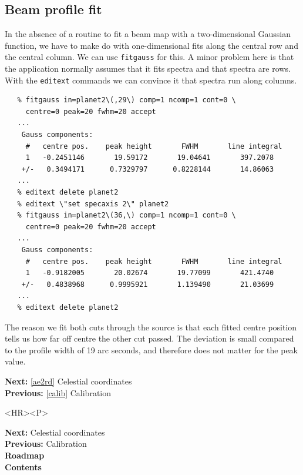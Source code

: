 \documentclass[11pt]{article}
\newenvironment{latexonly}{}{}
\newcommand{\htmlref}[2]{#1}
\newcommand{\xref}[3]{#1}
\newcommand{\xlabel}[1]{}
\begin{document}
\subsection{\label{beam}\xlabel{beam}Beam profile fit}

   In the absence of a routine to fit a beam map with a two-dimensional
   Gaussian function, we have to make do with one-dimensional fits
   along the central row and the central column. We can use
{\tt \xref{fitgauss}{sun140}{FITGAUSS}}
   for this. A minor problem here is that the application normally
   assumes that it fits spectra and that spectra are rows. With the
{\tt \xref{editext}{sun140}{EDITEXT}}
   commands we can convince it that spectra run along columns.

\begin{verbatim}
   % fitgauss in=planet2\(,29\) comp=1 ncomp=1 cont=0 \
     centre=0 peak=20 fwhm=20 accept
   ...
    Gauss components:
     #   centre pos.    peak height       FWHM       line integral
     1   -0.2451146       19.59172       19.04641       397.2078
    +/-   0.3494171      0.7329797      0.8228144       14.86063
   ...
   % editext delete planet2
   % editext \"set specaxis 2\" planet2
   % fitgauss in=planet2\(36,\) comp=1 ncomp=1 cont=0 \
     centre=0 peak=20 fwhm=20 accept
   ...
    Gauss components:
     #   centre pos.    peak height       FWHM       line integral
     1   -0.9182005       20.02674       19.77099       421.4740
    +/-   0.4838968      0.9995921       1.139490       21.03699
   ...
   % editext delete planet2
\end{verbatim}

   The reason we fit both cuts through the source is that each fitted
   centre position tells us how far off centre the other cut passed. The
   deviation is small compared to the profile width of 19 arc seconds,
   and therefore does not matter for the peak value.

\begin{latexonly}
{\bf Next:} \ref{ae2rd} Celestial coordinates\\
{\bf Previous:} \ref{calib} Calibration\\
\end{latexonly}

\begin{htmlonly}
\begin{rawhtml} <HR><P> \end{rawhtml}
{\bf \htmlref{Next:}{ae2rd}} Celestial coordinates\\
{\bf \htmlref{Previous:}{calib}} Calibration\\
{\bf \htmlref{Roadmap}{roadmap}}\\
{\bf \htmlref{Contents}{stardoccontents}}\\
\end{htmlonly}
\end{document}
